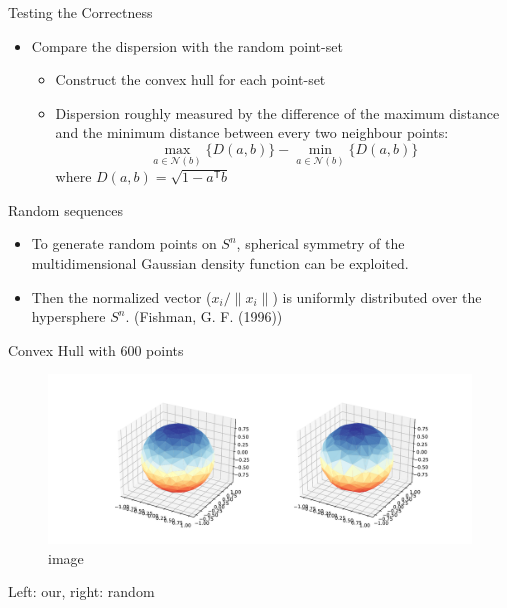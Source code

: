 \documentclass[10pt,ignorenonframetext,serif,onlymath]{beamer}
\begin{document}
\begin{frame}{Testing the Correctness}
\protect\hypertarget{testing-the-correctness}{}

\begin{itemize}
\item
  Compare the dispersion with the random point-set

  \begin{itemize}
  \item
    Construct the convex hull for each point-set
  \item
    Dispersion roughly measured by the difference of the maximum
    distance and the minimum distance between every two neighbour
    points: \[\max_{a \in \mathcal{N}(b)} \{D(a,b)\} - 
            \min_{a \in \mathcal{N}(b)} \{ D(a, b) \}\] where
    \(D(a,b) = \sqrt{1 - a^\mathsf{T} b}\)
  \end{itemize}
\end{itemize}

\end{frame}

\begin{frame}{Random sequences}
\protect\hypertarget{random-sequences}{}

\begin{itemize}
\item
  To generate random points on \(S^n\), spherical symmetry of the
  multidimensional Gaussian density function can be exploited.
\item
  Then the normalized vector (\(x_i/\|x_i\|\)) is uniformly distributed
  over the hypersphere \(S^n\). (Fishman, G. F. (1996))
\end{itemize}

\end{frame}

\begin{frame}{Convex Hull with \(600\) points}
\protect\hypertarget{convex-hull-with-600-points}{}

\begin{figure}
\centering
\includegraphics{res_compare.pdf}
\caption{image}
\end{figure}

Left: our, right: random

\end{frame}
\end{document}
